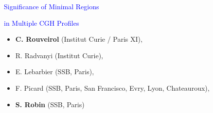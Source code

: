 \documentclass[dvips, lscape]{foils}
\newcommand{\textblue}[1]{\textcolor{blue}{#1}}
\newcommand{\chapter}[1]{
  \addtocounter{chapter}{1}
  \setcounter{section}{0}
  \setcounter{subsection}{0}
  {\centerline{\LARGE \textblue{\arabic{chapter} - #1}}}
  }
\newcommand{\paragraph}[1]{\noindent{\textblue{#1}}}
\begin{document}
\landscape
{}
\setcounter{chapter}{0}
\headrulewidth 0pt 
\pagestyle{fancy} 
\cfoot{}

\begin{center}
  \textblue{\LARGE Significance of Minimal Regions}
  
  \textblue{\LARGE  in Multiple CGH Profiles}
\end{center}

\paragraph{Working group:} 
\begin{itemize}
\item {\bf C. Rouveirol} (Institut Curie / Paris XI), 
\item R. Radvanyi (Institut Curie), 
\item E. Lebarbier (SSB, Paris), 
\item F. Picard (SSB, Paris, San Francisco, Evry, Lyon, Chateauroux),
\item {\bf S. Robin} (SSB, Paris)
\end{itemize}

\end{document}
